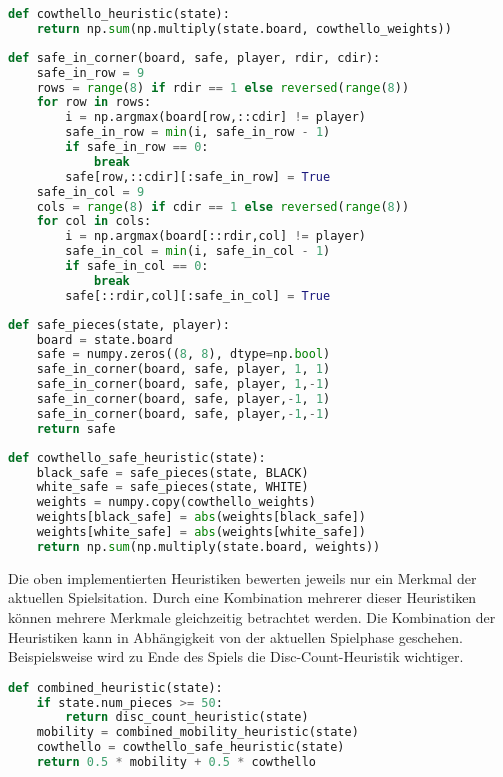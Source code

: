 \begin{lstlisting}[language=Python]
def cowthello_heuristic(state):
    return np.sum(np.multiply(state.board, cowthello_weights))
\end{lstlisting}

\begin{lstlisting}[language=Python]
def safe_in_corner(board, safe, player, rdir, cdir):
    safe_in_row = 9
    rows = range(8) if rdir == 1 else reversed(range(8))
    for row in rows:
        i = np.argmax(board[row,::cdir] != player)
        safe_in_row = min(i, safe_in_row - 1)
        if safe_in_row == 0:
            break
        safe[row,::cdir][:safe_in_row] = True
    safe_in_col = 9
    cols = range(8) if cdir == 1 else reversed(range(8))
    for col in cols:
        i = np.argmax(board[::rdir,col] != player)
        safe_in_col = min(i, safe_in_col - 1)
        if safe_in_col == 0:
            break
        safe[::rdir,col][:safe_in_col] = True
\end{lstlisting}

\begin{lstlisting}[language=Python]
def safe_pieces(state, player):
    board = state.board
    safe = numpy.zeros((8, 8), dtype=np.bool)
    safe_in_corner(board, safe, player, 1, 1)
    safe_in_corner(board, safe, player, 1,-1)
    safe_in_corner(board, safe, player,-1, 1)
    safe_in_corner(board, safe, player,-1,-1)
    return safe
\end{lstlisting}

\begin{lstlisting}[language=Python]
def cowthello_safe_heuristic(state):
    black_safe = safe_pieces(state, BLACK)
    white_safe = safe_pieces(state, WHITE)
    weights = numpy.copy(cowthello_weights)
    weights[black_safe] = abs(weights[black_safe])
    weights[white_safe] = abs(weights[white_safe])
    return np.sum(np.multiply(state.board, weights))
\end{lstlisting}

Die oben implementierten Heuristiken bewerten jeweils nur ein Merkmal
der aktuellen Spielsitation. Durch eine Kombination mehrerer dieser
Heuristiken können mehrere Merkmale gleichzeitig betrachtet werden. Die
Kombination der Heuristiken kann in Abhängigkeit von der aktuellen
Spielphase geschehen. Beispielsweise wird zu Ende des Spiels die
Disc-Count-Heuristik wichtiger.

\begin{lstlisting}[language=Python]
def combined_heuristic(state):
    if state.num_pieces >= 50:
        return disc_count_heuristic(state)
    mobility = combined_mobility_heuristic(state)
    cowthello = cowthello_safe_heuristic(state)
    return 0.5 * mobility + 0.5 * cowthello
\end{lstlisting}

